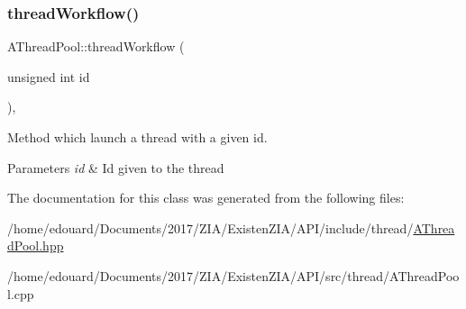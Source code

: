 \subsubsection{\texorpdfstring{thread\+Workflow()}{threadWorkflow()}}
{\footnotesize\ttfamily A\+Thread\+Pool\+::thread\+Workflow (\begin{DoxyParamCaption}\item[{unsigned int}]{id }\end{DoxyParamCaption})\hspace{0.3cm}{\ttfamily [protected]}, {}}



Method which launch a thread with a given id. 


\begin{DoxyParams}{Parameters}
{\em id} & Id given to the thread \\
\hline
\end{DoxyParams}


The documentation for this class was generated from the following files\+:\begin{DoxyCompactItemize}
\item 
/home/edouard/\+Documents/2017/\+Z\+I\+A/\+Existen\+Z\+I\+A/\+A\+P\+I/include/thread/\mbox{\hyperlink{AThreadPool_8hpp}{A\+Thread\+Pool.\+hpp}}\item 
/home/edouard/\+Documents/2017/\+Z\+I\+A/\+Existen\+Z\+I\+A/\+A\+P\+I/src/thread/A\+Thread\+Pool.\+cpp\end{DoxyCompactItemize}
